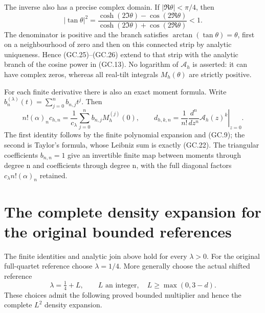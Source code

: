 \documentclass[11pt]{article}
\begin{document}
The inverse also has a precise complex domain. If
$|\Re\theta|<\pi/4$, then
\[
 |\tan\theta|^2=
 \frac{\cosh(2\Im\theta)-\cos(2\Re\theta)}
      {\cosh(2\Im\theta)+\cos(2\Re\theta)}<1.
\]
The denominator is positive and the branch satisfies
$\arctan(\tan\theta)=\theta$, first on a neighbourhood of zero
and then on this connected strip by analytic uniqueness. Hence
(GC.25)--(GC.26) extend to that strip with the analytic branch of
the cosine power in (GC.13). No logarithm of $\mathcal A_h$ is
asserted: it can have complex zeros, whereas all real-tilt integrals
$M_h(\theta)$ are strictly positive.

For each finite derivative there is also an exact moment formula.
Write $b_n^{(\lambda)}(t)=\sum_{j=0}^n b_{n,j}t^j$. Then
\[
 n!(\alpha)_nc_{h,n}
  =\frac1{c_\lambda}\sum_{j=0}^n b_{n,j}M_h^{(j)}(0),\qquad
 d_{h,k,n}=\frac1{n!}
      \left.\frac{d^n}{dz^n}\mathcal A_h(z)^k\right|_{z=0}.
                                                               \tag{GC.30}
\]
The first identity follows by the finite polynomial expansion and
(GC.9); the second is Taylor's formula, whose Leibniz sum is
exactly (GC.22). The triangular coefficients $b_{n,n}=1$ give an
invertible finite map between moments through degree n and coefficients
through degree n, with the full diagonal factors
$c_\lambda n!(\alpha)_n$ retained.

\section{The complete density expansion for the original bounded references}

The finite identities and analytic join above hold for every
$\lambda>0$. For the original full-quartet reference choose
$\lambda=1/4$. More generally choose the actual shifted reference
\[
 \lambda=\tfrac14+L,\qquad
 L\text{ an integer},\quad L\ge\max(0,3-d).                    \tag{GC.31}
\]
These choices admit the following proved bounded multiplier and hence
the complete $L^2$ density expansion.
\end{document}
